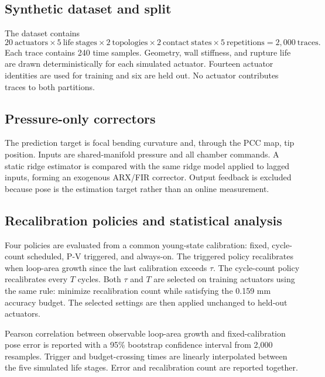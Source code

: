 \documentclass[preprints,article,submit,oneauthor]{Definitions/mdpi}
\begin{document}
\subsection{Synthetic dataset and split}

The dataset contains
\begin{equation}
20\ \mathrm{actuators}\times5\ \mathrm{life\ stages}\times2\ \mathrm{topologies}\times2\ \mathrm{contact\ states}\times5\ \mathrm{repetitions}=2{,}000\ \mathrm{traces}.
\end{equation}
Each trace contains 240 time samples. Geometry, wall stiffness, and rupture life are drawn deterministically for each simulated actuator. Fourteen actuator identities are used for training and six are held out. No actuator contributes traces to both partitions.

\subsection{Pressure-only correctors}

The prediction target is focal bending curvature and, through the PCC map, tip position. Inputs are shared-manifold pressure and all chamber commands. A static ridge estimator is compared with the same ridge model applied to lagged inputs, forming an exogenous ARX/FIR corrector. Output feedback is excluded because pose is the estimation target rather than an online measurement.

\subsection{Recalibration policies and statistical analysis}

Four policies are evaluated from a common young-state calibration: fixed, cycle-count scheduled, P-V triggered, and always-on. The triggered policy recalibrates when loop-area growth since the last calibration exceeds $\tau$. The cycle-count policy recalibrates every $T$ cycles. Both $\tau$ and $T$ are selected on training actuators using the same rule: minimize recalibration count while satisfying the 0.159 mm accuracy budget. The selected settings are then applied unchanged to held-out actuators.

Pearson correlation between observable loop-area growth and fixed-calibration pose error is reported with a 95\% bootstrap confidence interval from 2,000 resamples. Trigger and budget-crossing times are linearly interpolated between the five simulated life stages. Error and recalibration count are reported together.
\end{document}
